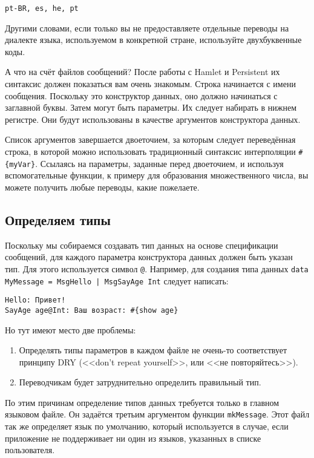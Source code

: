 \begin{lstlisting}
pt-BR, es, he, pt
\end{lstlisting}

Другими словами, если только вы не предоставляете отдельные переводы на
диалекте языка, используемом в конкретной стране, используйте двухбуквенные
коды.

А что на счёт файлов сообщений? После работы с Hamlet и Persistent их синтаксис
должен показаться вам очень знакомым. Строка начинается с имени сообщения.
Поскольку это конструктор данных, оно должно начинаться с заглавной буквы.
Затем могут быть параметры. Их следует набирать в нижнем регистре. Они будут
использованы в качестве аргументов конструктора данных.

Список аргументов завершается двоеточием, за которым следует переведённая
строка, в которой можно использовать традиционный синтаксис интерполяции
\lstinline'#{myVar}'. Ссылаясь на параметры, заданные перед двоеточием, и
используя вспомогательные функции, к примеру для образования множественного
числа, вы можете получить любые переводы, какие пожелаете.

\subsection{Определяем типы}

Поскольку мы собираемся создавать тип данных на основе спецификации сообщений,
для каждого параметра конструктора данных должен быть указан тип. Для этого
используется символ \verb'@'. Например, для создания типа данных
\lstinline'data MyMessage = MsgHello | MsgSayAge Int' следует написать:

\begin{lstlisting}
Hello: Привет!
SayAge age@Int: Ваш возраст: #{show age}
\end{lstlisting}

Но тут имеют место две проблемы:

\begin{enumerate}
  \item Определять типы параметров в каждом файле не очень-то соответствует
      принципу DRY (<<don't repeat yourself>>, или <<не повторяйтесь>>).

  \item Переводчикам будет затруднительно определить правильный тип.
\end{enumerate}

По этим причинам определение типов данных требуется только в главном языковом
файле. Он задаётся третьим аргументом функции \lstinline'mkMessage'. Этот файл
так же определяет язык по умолчанию, который используется в случае, если
приложение не поддерживает ни один из языков, указанных в списке пользователя.

